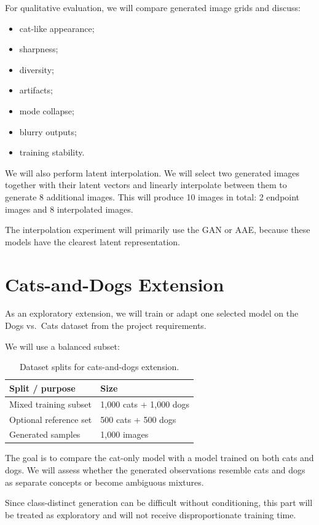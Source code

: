 \documentclass[11pt,a4paper]{article}
\begin{document}
For qualitative evaluation, we will compare generated image grids and discuss:
\begin{itemize}
    \item cat-like appearance;
    \item sharpness;
    \item diversity;
    \item artifacts;
    \item mode collapse;
    \item blurry outputs;
    \item training stability.
\end{itemize}

We will also perform latent interpolation. We will select two generated images together with their latent vectors and linearly interpolate between them to generate 8 additional images. This will produce 10 images in total: 2 endpoint images and 8 interpolated images.

The interpolation experiment will primarily use the GAN or AAE, because these models have the clearest latent representation.

\section{Cats-and-Dogs Extension}
As an exploratory extension, we will train or adapt one selected model on the Dogs vs.\ Cats dataset from the project requirements.

We will use a balanced subset:
\begin{table}[h]
\centering
\caption{Dataset splits for cats-and-dogs extension.}
\begin{tabular}{@{}ll@{}}
\toprule
\textbf{Split / purpose} & \textbf{Size} \\ \midrule
Mixed training subset & 1,000 cats + 1,000 dogs \\
Optional reference set & 500 cats + 500 dogs \\
Generated samples & 1,000 images \\ \bottomrule
\end{tabular}
\end{table}

The goal is to compare the cat-only model with a model trained on both cats and dogs. We will assess whether the generated observations resemble cats and dogs as separate concepts or become ambiguous mixtures.

Since class-distinct generation can be difficult without conditioning, this part will be treated as exploratory and will not receive disproportionate training time.
\end{document}
